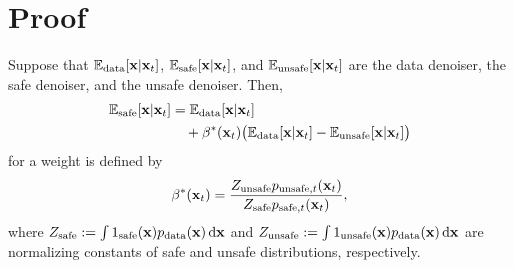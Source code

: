 \section{Proof}
\label{supp:proof}

\begin{reptheorem}%
Suppose that $\mathbb{E}_{\textup{data}}[\mathbf{x}\vert\mathbf{x}_{t}]$, $\mathbb{E}_{\textup{safe}}[\mathbf{x}\vert\mathbf{x}_{t}]$, and $\mathbb{E}_{\textup{unsafe}}[\mathbf{x}\vert\mathbf{x}_{t}]$ are the data denoiser, the safe denoiser, and the unsafe denoiser. Then,
    \begin{align*}%
        \mathbb{E}_{\textup{safe}}[\mathbf{x}\vert\mathbf{x}_{t}]&=\mathbb{E}_{\textup{data}}[\mathbf{x}\vert\mathbf{x}_{t}]\\
        &\quad+\beta^{*}(\mathbf{x}_{t})\big(\mathbb{E}_{\textup{data}}[\mathbf{x}\vert\mathbf{x}_{t}]-\mathbb{E}_{\textup{unsafe}}[\mathbf{x}\vert\mathbf{x}_{t}]\big) \nonumber
    \end{align*}
    for a weight is defined by
    \begin{align*}%
        \beta^{*}(\mathbf{x}_{t}) = \frac{Z_{\textup{unsafe}}p_{\textup{unsafe},t}(\mathbf{x}_{t})}{Z_{\textup{safe}}p_{\textup{safe},t}(\mathbf{x}_{t})},
    \end{align*}
    where $Z_{\textup{safe}}:=\int 1_{\textup{safe}}(\mathbf{x})p_{\textup{data}}(\mathbf{x})\mathop{}\!\mathrm{d}\mathbf{x}$ and $Z_{\textup{unsafe}}:=\int 1_{\textup{unsafe}}(\mathbf{x})p_{\textup{data}}(\mathbf{x})\mathop{}\!\mathrm{d}\mathbf{x}$ are normalizing constants of safe and unsafe distributions, respectively.
\end{reptheorem}

